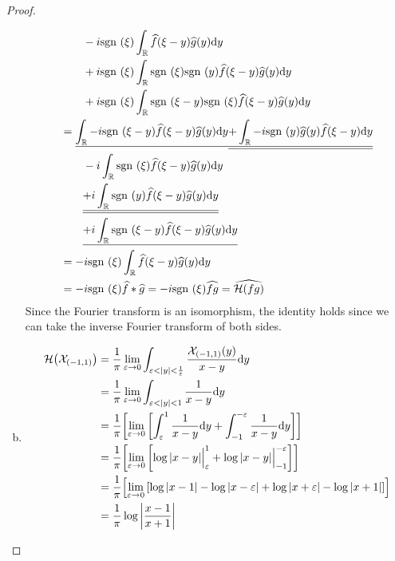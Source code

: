 \documentclass{article} %
\theoremstyle{plain}
\newcommand{\E}{\varepsilon}
\def\Rl{\mathbb{R}}
\newcommand{\sgn}{\text{\rm sgn }}
\newcommand{\Hilb}{\mathcal{H}}
\numberwithin{equation}{section} %
\numberwithin{figure}{section} %
\numberwithin{table}{section} %
\begin{document}
\begin{proof}
\begin{enumerate}[(a)]
\begin{align*}
            &\qquad - i\sgn(\xi)\int_\Rl \widehat{f}(\xi - y)\widehat{g}(y)\dd y \\
            &\qquad + i\sgn(\xi)\int_\Rl\sgn(\xi)\sgn(y)\widehat{f}(\xi - y)\widehat{g}(y)\dd y \\
            &\qquad +i\sgn(\xi) \int_\Rl \sgn(\xi - y)\sgn(\xi)\widehat{f}(\xi - y)\widehat{g}(y) \dd y \\
            &= \underline{\int_\Rl -i\sgn(\xi-y)\widehat{f}(\xi - y)\widehat{g}(y)\dd y} \underline{\underline{+ \int_\Rl -i\sgn(y)\widehat{g}(y)\widehat{f}(\xi - y) \dd y}} \\
            &\qquad - i\int_\Rl \sgn(\xi)\widehat{f}(\xi - y)\widehat{g}(y)\dd y \\
            &\qquad \underline{\underline{+ i \int_\Rl \sgn(y)\widehat{f}(\xi - y)\widehat{g}(y)\dd y}} \\
            &\qquad \underline{+i \int_\Rl \sgn(\xi - y)\widehat{f}(\xi - y)\widehat{g}(y) \dd y} \\
            &= -i\sgn(\xi)\int_\Rl \widehat{f}(\xi - y)\widehat{g}(y) \dd y \\
            &= -i\sgn(\xi)\widehat{f}*\widehat{g} = -i\sgn(\xi)\widehat{fg} = \widehat{\Hilb(fg)}
        \end{align*}
        Since the Fourier transform is an isomorphism, the identity holds since we can take the inverse Fourier transform of both sides.
        \item \begin{align*}
            \Hilb\qty(\mathcal{X}_{(-1,1)}) &= \frac{1}{\pi}\lim_{\E \rightarrow 0}\int_{\E < \abs{y} < \frac{1}{\E}}\frac{\mathcal{X}_{(-1,1)}(y)}{x - y} \dd y \\
            &= \frac{1}{\pi}\lim_{\E \rightarrow 0}\int_{\E < \abs{y} < 1}\frac{1}{x - y} \dd y \\
            &= \frac{1}{\pi}\qty[\lim_{\E \rightarrow 0}\qty[\int_\E^1 \frac{1}{x - y}\dd y + \int_{-1}^{-\E} \frac{1}{x - y}\dd y]] \\
            &= \frac{1}{\pi}\qty[\lim_{\E \rightarrow 0} \qty[\log{\abs{x - y}}\Big|_{\E}^1 + \log{\abs{x - y}}\Big|_{-1}^{-\E}]] \\
            &= \frac{1}{\pi}\qty[\lim_{\E\rightarrow 0}\qty[\log{\abs{x - 1}} - \log{\abs{x - \E}} + \log{\abs{x + \E}} - \log{\abs{x + 1}}]] \\
            &= \frac{1}{\pi}\log{\abs{\frac{x - 1}{x + 1}}}
        \end{align*}
    \end{enumerate}
\end{proof}
\end{document}
